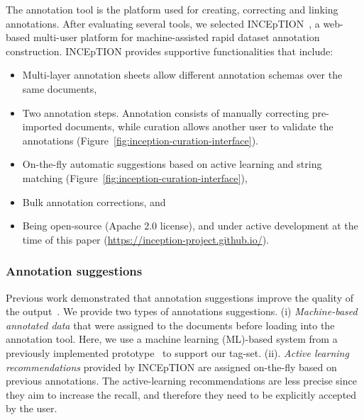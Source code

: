\documentclass[fleqn,10pt]{wlscirep}
\begin{document}
The annotation tool is the platform used for creating, correcting and linking annotations.
After evaluating several tools, we selected INCEpTION~\cite{tubiblio106270,eckart-de-castilho-etal-2016-web}, a web-based multi-user platform for machine-assisted rapid dataset annotation construction. 
INCEpTION provides supportive functionalities that include: 
\begin{itemize}
    \item Multi-layer annotation sheets allow different annotation schemas over the same documents, 
    \item Two annotation steps. Annotation consists of manually correcting pre-imported documents, while curation allows another user to validate the annotations (Figure~\ref{fig:inception-curation-interface}). 
    \item On-the-fly automatic suggestions based on active learning and string matching (Figure~\ref{fig:inception-curation-interface}), 
    \item Bulk annotation corrections, and 
    \item Being open-source (Apache 2.0 license), and under active development at the time of this paper (\url{https://inception-project.github.io/}).
\end{itemize}

\subsubsection*{Annotation suggestions}
\label{subsec:automatic-system-prototype}

Previous work demonstrated that annotation suggestions improve the quality of the output~\cite{Fort2010InfluenceOP,Nvol2011SemiautomaticSA,Lingren2014EvaluatingTI}.
We provide two types of annotations suggestions. 
(i) \textit{Machine-based annotated data} that were assigned to the documents before loading into the annotation tool. Here, we use a machine learning (ML)-based system from a previously implemented prototype~\cite{foppiano2019proposal} to support our tag-set. 
(ii). \textit{Active learning recommendations} provided by INCEpTION are assigned on-the-fly based on previous annotations. 
The active-learning recommendations are less precise since they aim to increase the recall, and therefore they need to be explicitly accepted by the user.
\end{document}
